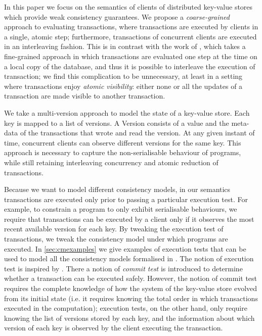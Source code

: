In this paper we focus on the semantics of clients of distributed key-value 
stores which provide weak consistency guarantees. 
We propose a \emph{coarse-grained} approach to evaluating transactions, 
where transactions are executed by clients in a single, atomic step; furthermore, 
transactions of concurrent clients are executed in an interleaving fashion.
This is in contrast with the work of \cite{alonetogether}, which 
takes a fine-grained approach in which transactions are evaluated one step 
at the time on a local copy of the database, and thus it is possible 
to interleave the execution of transaction; we find this complication to be 
unnecessary, at least in a setting where transactions enjoy \emph{atomic 
visibility}: either none or all the updates of a transaction are made 
visible to another transaction. 

We take a multi-version approach to model the state of a key-value store. 
Each key is mapped to a list of versions. A Version consists of a 
value and the meta-data of the transactions that wrote and read the version. 
At any given instant of time, concurrent clients can observe different versions for the same key.
This approach is necessary to capture the non-serialisable behaviour of 
programs, while still retaining interleaving concurrency and atomic reduction 
of transactions. 

Because we want to model different consistency models, in our semantics 
transactions are executed only prior to passing a particular execution test. For example, 
to constrain a program to only exhibit serialisable behaviours, we require that 
transactions can be executed by a client only if it observes the most 
recent available version for each key. By tweaking the execution test 
of transactions, we tweak the consistency model under which programs 
are executed. In \cref{sec:cmexamples} we give examples of execution tests 
that can be used to model all the consistency models formalised in \cite{framework-concur}.
The notion of execution test is inspired by \cite{seebelieve}. There a notion of \emph{commit test} is introduced 
to determine whether a transaction can be executed safely. However, 
the notion of commit test requires the complete knowledge of 
how the system of the key-value store evolved from its 
initial state (i.e. it requires knowing the total order in which transactions executed in 
the computation); execution tests, on the other hand, only require
knowing the list of versions stored by each key, and the 
information about which version of each key is observed 
by the client executing the transaction.

